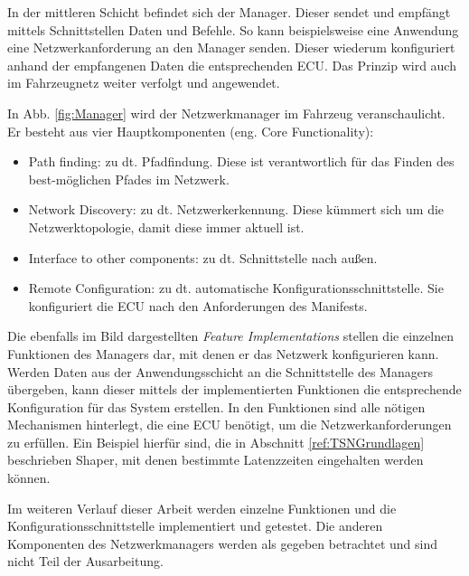 
\newpage
In der mittleren Schicht befindet sich der Manager. Dieser sendet und empfängt mittels Schnittstellen Daten und Befehle. So kann beispielsweise eine Anwendung eine Netzwerkanforderung an den Manager senden. Dieser wiederum konfiguriert anhand der empfangenen Daten die entsprechenden \ac{ECU}. Das Prinzip wird auch im Fahrzeugnetz weiter verfolgt und angewendet.

In Abb. \ref{fig:Manager} wird der Netzwerkmanager im Fahrzeug veranschaulicht. Er besteht aus vier Hauptkomponenten (eng. Core Functionality):

\begin{itemize}
	\item Path finding: zu dt.  Pfadfindung. Diese ist verantwortlich für das Finden des best-möglichen Pfades im Netzwerk.
	\item Network Discovery: zu dt. Netzwerkerkennung. Diese kümmert sich um die Netzwerktopologie, damit diese immer aktuell ist.
	\item Interface to other components: zu dt. Schnittstelle nach außen.
	\item Remote Configuration: zu dt. automatische Konfigurationsschnittstelle. Sie konfiguriert die \ac{ECU} nach den Anforderungen des Manifests.
\end{itemize}

\newpage


Die ebenfalls im Bild dargestellten \emph{Feature Implementations} stellen die einzelnen Funktionen des Managers dar, mit denen er das Netzwerk konfigurieren kann. Werden Daten aus der Anwendungsschicht an die Schnittstelle des Managers übergeben, kann dieser mittels der implementierten Funktionen die entsprechende Konfiguration für das System erstellen. In den Funktionen sind alle nötigen Mechanismen hinterlegt, die eine \ac{ECU} benötigt, um die Netzwerkanforderungen zu erfüllen. Ein Beispiel hierfür sind, die in Abschnitt \ref{ref:TSNGrundlagen} beschrieben Shaper, mit denen bestimmte Latenzzeiten eingehalten werden können.

Im weiteren Verlauf dieser Arbeit werden einzelne Funktionen und die Konfigurationsschnittstelle implementiert und getestet. Die anderen Komponenten des Netzwerkmanagers werden als gegeben betrachtet und sind nicht Teil der Ausarbeitung.


